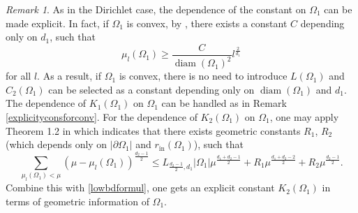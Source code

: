 \documentclass[11pt,letterpaper]{amsart}
\numberwithin{equation}{section}
\theoremstyle{plain}
\theoremstyle{plain}
\numberwithin{equation}{section}
\theoremstyle{remark}
\newtheorem{remark}[theorem]{Remark}
\DeclareMathOperator{\diam}{diam}
\begin{document}
	\begin{remark}
		\label{ConstforconvN}
		As in the Dirichlet case, the dependence of the constant on $\Omega_1$ can be made explicit. In fact, if $\Omega_1$ is convex, by \cite[Theorem 5.3]{LY86}, there exists a constant $C$ depending only on $d_1$, such that
		\begin{equation}\label{lowbdformul}
			\mu_l(\Omega_1)\ge \frac C{\diam(\Omega_1)^2} l^{\frac 2{d_1}}
		\end{equation} 
		for all $l$. As a result, if $\Omega_1$ is convex, there is no need to introduce $L(\Omega_1)$ and $C_2(\Omega_1)$ can be selected as a constant depending only on $\diam(\Omega_1)$  and $d_1$. The dependence of $K_1(\Omega_1)$ on $\Omega_1$ can be handled as in Remark \ref{explicityconsforconv}. For the dependence of $K_2(\Omega_1)$ on $\Omega_1$, one may apply Theorem 1.2 in \cite{FL24Lip} which indicates that there exists geometric constants $R_1$, $R_2$ (which depends only on $|\partial\Omega_1|$ and $r_{\mathrm{in}}(\Omega_1)$), such that 
		\[
		\underset{\mu_l(\Omega_1)<\mu}{\sum}(\mu- \mu_l(\Omega_1))^{\frac{d_2-1}{2}} \le L_{\frac{d_2-1}{2}, d_1} |\Omega_1|\mu^{\frac{d_1+d_2-1}{2}}+R_1 \mu^{\frac{d_1+d_2-2}{2}}+R_2\mu^{\frac{d_2-1}{2}}.
		\]
		Combine this with \eqref{lowbdformul}, one gets an explicit constant $K_2(\Omega_1)$ in terms of geometric information of $\Omega_1$. 
 
		
		

	\end{remark}
	
\end{document}
